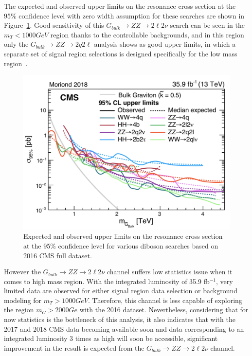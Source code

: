 The expected and observed upper limits on the resonance cross section at the 95\% confidence level with zero width assumption for these searches are shown in Figure~\ref{fig:sum_bulkGlimits}. Good sensitivity of this $G_{bulk}\rightarrow ZZ\rightarrow 2\ell 2\nu$ search can be seen in the $m_T < 1000 GeV$ region thanks to the controllable backgrounds, and in this region only the $G_{bulk}\rightarrow ZZ\rightarrow 2q 2\ell$ analysis shows as good upper limits, in which a separate set of signal region selections is designed specifically for the low mass region~\cite{sum_zzqqll}.
\begin{figure}[htbp]
\begin{center}
\includegraphics[width=0.9\linewidth]{figures/sum_bulkGlimits.pdf}
\caption{Expected and observed upper limits on the resonance cross section at the 95\% confidence level for various diboson searches based on 2016 CMS full dataset.}
\label{fig:sum_bulkGlimits}
\end{center}
\end{figure}

\vspace{0.3cm}
However the $G_{bulk}\rightarrow ZZ\rightarrow 2\ell 2\nu$ channel suffers low statistics issue when it comes to high mass region. With the integrated luminosity of 35.9 fb$^{-1}$, very limited data are observed for either signal region data selection or background modeling for $m_T >1000 GeV$. Therefore, this channel is less capable of exploring the region $m_G >2000Ge$ with the 2016 dataset. Nevertheless, considering that for now statistics is the bottleneck of this analysis, it also indicates that with the 2017 and 2018 CMS data becoming available soon and data corresponding to an integrated luminosity 3 times as high will soon be accessible, significant improvement in the result is expected from the $G_{bulk}\rightarrow ZZ\rightarrow 2\ell 2\nu$ channel.
